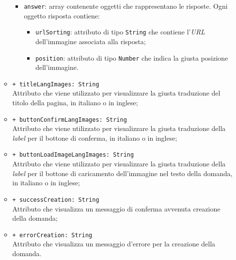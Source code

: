 \begin{itemize}
\begin{itemize}
			\begin{itemize}
				\item \texttt{answer}: array contenente oggetti che rappresentano le risposte. Ogni oggetto risposta contiene:
				\begin{itemize}
					\item \texttt{urlSorting}: attributo di tipo \texttt{String} che contiene l'\textit{URL} dell'immagine associata alla risposta;
					\item \texttt{position}: attributo di tipo \texttt{Number} che indica la giusta posizione dell'immagine.
				\end{itemize}
			\end{itemize}	  
		\item \texttt{+ titleLangImages: String} \\ Attributo che viene utilizzato per visualizzare la giusta traduzione del titolo della pagina, in italiano o in inglese;
		\item \texttt{+ buttonConfirmLangImages: String} \\ Attributo che viene utilizzato per visualizzare la giusta traduzione della \textit{label} per il bottone di conferma, in italiano o in inglese;
		\item \texttt{+ buttonLoadImageLangImages: String} \\ Attributo che viene utilizzato per visualizzare la giusta traduzione della \textit{label} per il bottone di caricamento dell'immagine nel testo della domanda, in italiano o in inglese;
		\item \texttt{+ successCreation: String} \\ Attributo che visualizza un messaggio di conferma avvenuta creazione della domanda;
		\item \texttt{+ errorCreation: String} \\ Attributo che visualizza un messaggio d'errore per la creazione della domanda.
	\end{itemize}
\end{itemize}
